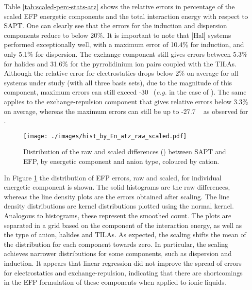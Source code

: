 Table \ref{tab:scaled-perc-stats-atz} shows the relative errors in percentage of the scaled EFP energetic components and the total interaction energy with respect to SAPT.
One can clearly see that the errors for the induction and dispersion components reduce to below 20\%.
It is important to note that [Hal] systems performed exceptionally well, with a maximum error of 10.4\% for induction, and only 5.1\% for dispersion.
The exchange component still gives errors between 5.3\% for  halides and 31.6\% for the pyrrolidinium ion pairs coupled with the TILAs.
Although the relative error for electrostatics drops below 2\% on average for all systems under study (with all three basis sets), due to the magnitude of this component, maximum errors can still exceed -30 \enUnit~(\emph{e.g.} in the case of ).
The same applies to the exchange-repulsion component that gives relative errors below 3.3\% on average, whereas the maximum errors can still be up to -27.7 \enUnit~ as observed for .


\begin{figure}[h]
    \caption{Distribution of the raw and scaled differences (\enUnit) between SAPT and EFP, by energetic component and anion type, coloured by cation.}
    \label{fig:hist-raw-scaled-atz}
    \centering
    \texttt{[image: ./images/hist\_by\_En\_atz\_raw\_scaled.pdf]}
\end{figure}


In Figure \ref{fig:hist-raw-scaled-atz} the distribution of EFP errors, raw and scaled, for individual energetic component is shown.
The solid histograms are the raw differences, whereas the line density plots are the errors obtained after scaling.
The line density distributions are kernel distributions plotted using the normal kernel.
Analogous to histograms, these represent the smoothed count.
The plots are separated in a grid based on the component of the interaction energy, as well as the type of anion, halides and TILAs.
As expected, the scaling shifts the mean of the distribution for each component towards zero.
In particular, the scaling achieves narrower distributions for some components, such as dispersion and induction.
It appears that linear regression did not improve the spread of errors for electrostatics and exchange-repulsion, indicating that there are shortcomings in the EFP formulation of these components when applied to ionic liquids.


